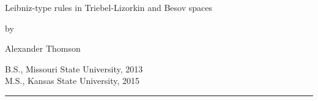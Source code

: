 \begin{center}

   \vspace{1cm}


   \large Leibniz-type rules in Triebel-Lizorkin and Besov spaces\\

   \vspace{0.5cm}

   by\\

   \vspace{0.5cm}


   \large Alexander Thomson\\

   \vspace{0.5cm}


  B.S., Missouri State University, 2013 \\
  M.S., Kansas State University, 2015\\

   \vspace{0.55cm}
   \rule{2in}{0.5pt}\\
   \vspace{0.75cm}


\end{center}
